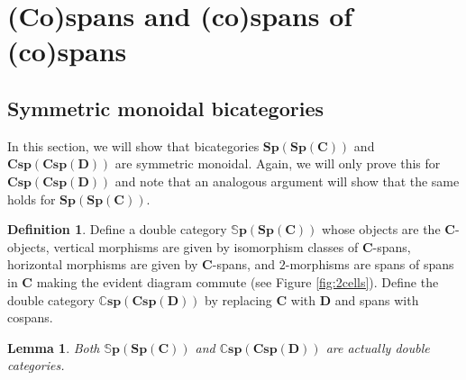 \documentclass[11pt]{amsart}
\newcommand{\cat}[1]{\mathbf{#1}}
\newcommand{\bispsp}[1]{\mathbf{Sp(Sp(#1))}}
\newcommand{\dblspsp}[1]{\mathbb{S}\mathbf{p(Sp(#1))}}
\newcommand{\bicspcsp}[1]{\mathbf{Csp(Csp(#1))}}
\newcommand{\dblcspcsp}[1]{\mathbb{C}\mathbf{sp(Csp(#1))}}
\newtheorem{lem}[thm]{Lemma}
\theoremstyle{remark}
\theoremstyle{definition}
\newtheorem{defn}[thm]{Definition}
\begin{document}
\section{(Co)spans and (co)spans of (co)spans}                  
\label{sec:SpansSpans}

\subsection{Symmetric monoidal bicategories} %
\label{subsec.SpansSpanssAreSMBicat}

In this section, we will show that bicategories $\bispsp{C}$ and $\bicspcsp{D}$ are symmetric monoidal. Again, we will only prove this for $\bicspcsp{D}$ and note that an analogous argument will show that the same holds for $\bispsp{C}$.  

\begin{defn}
\label{def:DblCatSpanSpan}
	Define a double category $\dblspsp{C}$ whose objects are the $\cat{C}$-objects, vertical morphisms are given by isomorphism classes of $\cat{C}$-spans, horizontal morphisms are given by $\cat{C}$-spans, and $2$-morphisms are spans of spans in $\cat{C}$ making the evident diagram commute (see Figure \ref{fig:2cells}). Define the double category $\dblcspcsp{D}$ by replacing $\cat{C}$ with $\cat{D}$ and spans with cospans.  
\end{defn}

\begin{lem}
	\label{lem:SpanSpanDoubleCat}
	Both $\dblspsp{C}$ and $\dblcspcsp{D}$ are actually double categories.  
\end{lem}
\end{document}
